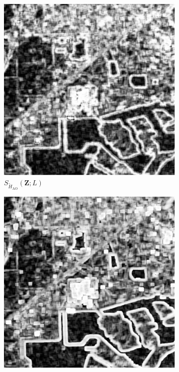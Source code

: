 \begin{figure}[H]
  \centering
  \begin{subfigure}[b]{0.3\textwidth}
    \centering
    \includegraphics[width=\textwidth]{../../Figures/PNG/Entropy_lake_512_36L_AO_100b}
    \caption{$S_{\widetilde{H}_{\text{AO}}}(\bm{Z}; L)$}
    \label{fig:test_lake-1}
  \end{subfigure}
  \hfill
  \begin{subfigure}[b]{0.3\textwidth}
    \centering
    \includegraphics[width=\textwidth]{../../Figures/PNG/cv_lake_512}

\end{subfigure}
\end{figure}
